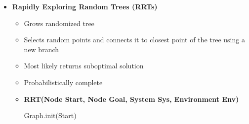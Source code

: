 \documentclass[a4paper]{article}
\newcommand{\ipro}{\item[+]}
\newcommand{\ides}[1]{\item \textbf{#1}}
\begin{document}
\begin{itemize}
\begin{itemize}
\begin{itemize}
                    \item Good for single source shortest path
                    \item Runtime depends on chosen $h(n)$
                    \ipro First solution found is optional
                    \ipro Very efficient if we are ok finding a suboptimal solution
                        \begin{itemize}
                            \item Done if $\epsilon > 1$
                        \end{itemize}
                    \item Greedy backtracking of solution
                    \ides{A-Star(Graph G, Heur H, Node Start, Node Goal)}
                        \begin{algorithmic}
                            \STATE HEUR-MIN-HEAP.push(Start)
                                \STATE Node current $\leftarrow$ HEUR-MIN-HEAP.pop()
                                    \RETURN SUCCESS
                                \ENDIF
                                \STATE visited.push(current)
                                \STATE Nodes next = getNeighbours(current)
                                    \STATE HEUR-MIN-HEAP.push(next)
                                \ENDFOR
                            \ENDWHILE
                            \RETURN FAILURE
                        \end{algorithmic}
                \end{itemize}
            \ides{Rapidly Exploring Random Trees (RRTs)}
                \begin{itemize}
                    \item Grows randomized tree
                    \item Selects random points and connects it to closest point of the tree using a new branch
                    \item Most likely returns suboptimal solution
                    \item Probabilistically complete
                    \ides{RRT(Node Start, Node Goal, System Sys, Environment Env)}
                        \begin{algorithmic}
                            \STATE Graph.init(Start)

\end{algorithmic}
\end{itemize}
\end{itemize}
\end{itemize}
\end{document}
